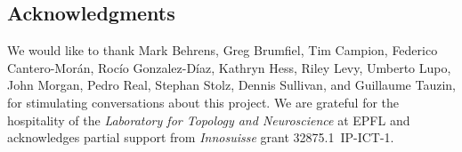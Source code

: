 
\subsection*{Acknowledgments}

We would like to thank Mark Behrens, Greg Brumfiel, Tim Campion, Federico Cantero-Mor\'an, Roc\'io Gonzalez-D\'iaz, Kathryn Hess, Riley Levy, Umberto Lupo, John Morgan, Pedro Real, Stephan Stolz, Dennis Sullivan, and Guillaume Tauzin, for stimulating conversations about this project.
We are grateful for the hospitality of the \textit{Laboratory for Topology and Neuroscience} at EPFL and acknowledges partial support from \textit{Innosuisse} grant \mbox{32875.1 IP-ICT-1}.